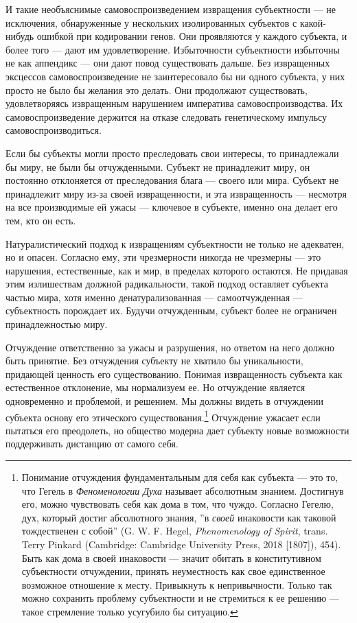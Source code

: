 \documentclass[12pt]{book}
\begin{document}
И такие необъяснимые самовоспроизведением извращения субъектности --- не исключения, обнаруженные у нескольких изолированных субъектов с какой-нибудь ошибкой при кодировании генов. Они проявляются у каждого субъекта, и более того --- дают им удовлетворение. Избыточности субъектности избыточны не как аппендикс --- они дают повод существовать дальше. Без извращенных эксцессов самовоспроизведение не заинтересовало бы ни одного субъекта, у них просто не было бы желания это делать. Они продолжают существовать, удовлетворяясь извращенным нарушением императива самовоспроизводства. Их самовоспроизведение держится на отказе следовать генетическому импульсу самовоспроизводиться.

Если бы субъекты могли просто преследовать свои интересы, то принадлежали бы миру, не были бы отчужденными. Субъект не принадлежит миру, он постоянно отклоняется от преследования блага --- своего или мира. Субъект не принадлежит миру из-за своей извращенности, и эта извращенность --- несмотря на все производимые ей ужасы --- ключевое в субъекте, именно она делает его тем, кто он есть.

Натуралистический подход к извращениям субъектности не только не адекватен, но и опасен. Согласно ему, эти чрезмерности никогда не чрезмерны --- это нарушения, естественные, как и мир, в пределах которого остаются. Не придавая этим излишествам должной радикальности, такой подход оставляет субъекта частью мира, хотя именно денатурализованная --- самоотчужденная --- субъектность порождает их. Будучи отчужденным, субъект более не ограничен принадлежностью миру.

Отчуждение ответственно за ужасы и разрушения, но ответом на него должно быть принятие. Без отчуждения субъекту не хватило бы уникальности, придающей ценность его существованию. Понимая извращенность субъекта как естественное отклонение, мы нормализуем ее. Но отчуждение является одновременно и проблемой, и решением. Мы должны видеть в отчуждении субъекта основу его этического существования.\footnote{Понимание отчуждения фундаментальным для себя как субъекта --- это то, что Гегель в \textit{Феноменологии Духа} называет абсолютным знанием. Достигнув его, можно чувствовать себя как дома в том, что чуждо. Согласно Гегелю, дух, который достиг абсолютного знания, ''в \textit{своей} инаковости как таковой тождественен с собой'' (G. W. F. Hegel, \textit{Phenomenology of Spirit}, trans. Terry Pinkard (Cambridge: Cambridge University Press, 2018 [1807]), 454). Быть как дома в своей инаковости --- значит обитать в конститутивном субъектности отчуждении, принять неуместность как свое единственное возможное отношение к месту. Привыкнуть к непривычности. Только так можно сохранить проблему субъектности и не стремиться к ее решению --- такое стремление только усугубило бы ситуацию.} Отчуждение ужасает если пытаться его преодолеть, но общество модерна дает субъекту новые возможности поддерживать дистанцию от самого себя.
\end{document}
